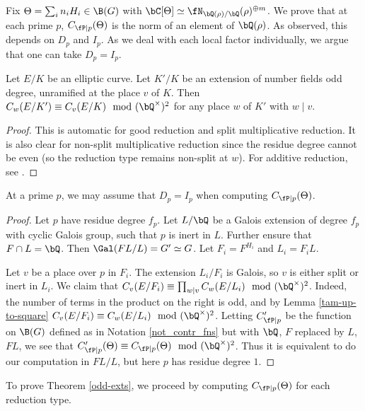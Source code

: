 Fix $\Theta = \sum_i n_i H_i \in \B(G)$ with $\bC[\Theta] \simeq \repnorm{\rho}^{\oplus m}$. We prove that at each prime $p$, $C_{\fP \mid p}(\Theta)$ is the norm of an element of $\bQ(\rho)$.  As observed, this depends on $D_p$ and $I_p$. As we deal with each local factor individually, we argue that one can take $D_p = I_p$.

\begin{lemma}\label{tam-up-to-square}
    Let $E / K$ be an elliptic curve. Let $K' / K$ be an extension of number fields odd degree, unramified at the place $v$ of $K$. Then $C_w(E / K') \equiv C_v(E / K) \mod (\bQ^{\times})^2$ for any place $w$ of $K'$ with $ w \mid v$. 
\end{lemma}

\begin{proof}
This is automatic for good reduction and split multiplicative reduction. It is also clear for non-split multiplicative reduction since the residue degree cannot be even (so the reduction type remains non-split at $w$). For additive reduction, see \cite[Lemma 3.12]{reg-const}.
\end{proof}

\begin{lemma}\label{DeqI}
    At a prime $p$, we may assume that $D_p = I_p$ when computing $C_{\fP \mid p}(\Theta)$. 
\end{lemma}

\begin{proof}
Let $p$ have residue degree $f_p$. Let $L / \bQ$ be a Galois extension of degree $f_p$ with cyclic Galois group, such that $p$ is inert in $L$. Further ensure that $F \cap L = \bQ$. Then $\Gal(FL / L) = G' \simeq G$. Let $F_i = F^{H_i}$ and $L_i = F_i L$.

Let $v$ be a place over $p$ in $F_i$. The extension $L_i / F_i$ is Galois, so $v$ is either split or inert in $L_i$.
We claim that $C_v(E / F_i) \equiv \prod_{w | v} C_w(E / L_i) \mod (\bQ^{\times})^2$. Indeed, the number of terms in the product on the right is odd, and by Lemma \ref{tam-up-to-square} $C_v(E / F_i) \equiv C_w(E / L_i) \mod (\bQ^{\times})^2$. 
Letting $C_{\fP \mid p}'$ be the function on $\B(G)$ defined as in Notation \ref{not_contr_fns} but with $\bQ$, $F$ replaced by $L$, $FL$, we see that $C_{\fP \mid p}'(\Theta) \equiv C_{\fP \mid p}(\Theta) \mod (\bQ^{\times})^2$. 
Thus it is equivalent to do our computation in $FL / L$, but here $p$ has residue degree $1$.
\end{proof}

To prove Theorem \ref{odd-exts}, we proceed by computing $C_{\fP \mid p}(\Theta)$ for each reduction type.

